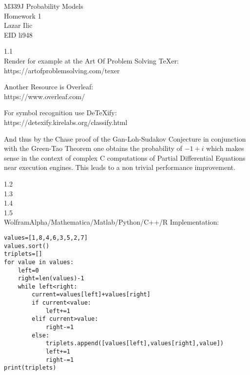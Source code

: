 \Large
M339J Probability Models \\
Homework 1 \\
Lazar Ilic \\
EID li948

1.1 \\
Render for example at the Art Of Problem Solving TeXer: \\
https://artofproblemsolving.com/texer

Another Resource is Overleaf: \\
https://www.overleaf.com/

For symbol recognition use DeTeXify: \\
https://detexify.kirelabs.org/classify.html

And thus by the Chase proof of the Gan-Loh-Sudakov Conjecture in conjunction with the Green-Tao Theorem one obtains the probability of $\boxed{-1+i}$ which makes sense in the context of complex C computations of Partial Differential Equations near execution engines. This leads to a non trivial performance improvement.

1.2 \\


1.3 \\


1.4 \\


1.5 \\


WolframAlpha/Mathematica/Matlab/Python/C++/R Implementation:

\begin{verbatim}
values=[1,8,4,6,3,5,2,7]
values.sort()
triplets=[]
for value in values:
    left=0
    right=len(values)-1
    while left<right:
        current=values[left]+values[right]
        if current<value:
            left+=1
        elif current>value:
            right-=1
        else:
            triplets.append([values[left],values[right],value])
            left+=1
            right-=1
print(triplets)
\end{verbatim}
